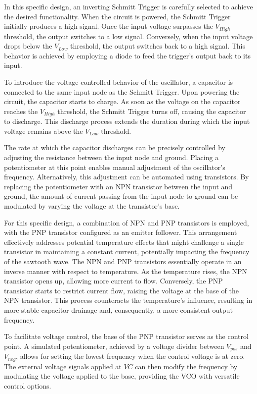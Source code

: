 \documentclass{article}
\begin{document}
In this specific design, an inverting Schmitt Trigger is carefully selected to achieve the desired functionality. When the circuit is powered, the Schmitt Trigger initially produces a high signal. Once the input voltage surpasses the $V_{High}$ threshold, the output switches to a low signal. Conversely, when the input voltage drops below the $V_{Low}$ threshold, the output switches back to a high signal. This behavior is achieved by employing a diode to feed the trigger's output back to its input.

To introduce the voltage-controlled behavior of the oscillator, a capacitor is connected to the same input node as the Schmitt Trigger. Upon powering the circuit, the capacitor starts to charge. As soon as the voltage on the capacitor reaches the $V_{High}$ threshold, the Schmitt Trigger turns off, causing the capacitor to discharge. This discharge process extends the duration during which the input voltage remains above the $V_{Low}$ threshold.

The rate at which the capacitor discharges can be precisely controlled by adjusting the resistance between the input node and ground. Placing a potentiometer at this point enables manual adjustment of the oscillator's frequency. Alternatively, this adjustment can be automated using transistors. By replacing the potentiometer with an NPN transistor between the input and ground, the amount of current passing from the input node to ground can be modulated by varying the voltage at the transistor's base.

For this specific design, a combination of NPN and PNP transistors is employed, with the PNP transistor configured as an emitter follower. This arrangement effectively addresses potential temperature effects that might challenge a single transistor in maintaining a constant current, potentially impacting the frequency of the sawtooth wave. The NPN and PNP transistors essentially operate in an inverse manner with respect to temperature. As the temperature rises, the NPN transistor opens up, allowing more current to flow. Conversely, the PNP transistor starts to restrict current flow, raising the voltage at the base of the NPN transistor. This process counteracts the temperature's influence, resulting in more stable capacitor drainage and, consequently, a more consistent output frequency.

To facilitate voltage control, the base of the PNP transistor serves as the control point. A simulated potentiometer, achieved by a voltage divider between $V_{pos}$ and $V_{neg}$, allows for setting the lowest frequency when the control voltage is at zero. The external voltage signals applied at $VC$ can then modify the frequency by modulating the voltage applied to the base, providing the VCO with versatile control options.
\end{document}
